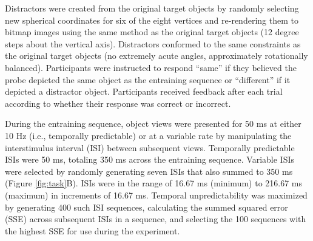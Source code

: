 \documentclass[dwyatte_dissertation.tex]{subfiles}
\begin{document}
Distractors were created from the original target objects by randomly selecting new spherical coordinates for six of the eight vertices and re-rendering them to bitmap images using the same method as the original target objects (12 degree steps about the vertical axis). Distractors conformed to the same constraints as the original target objects (no extremely acute angles, approximately rotationally balanced). Participants were instructed to respond ``same'' if they believed the probe depicted the same object as the entraining sequence or ``different'' if it depicted a distractor object. Participants received feedback after each trial according to whether their response was correct or incorrect. %

During the entraining sequence, object views were presented for 50 ms at either 10 Hz (i.e., temporally predictable) or at a variable rate by manipulating the interstimulus interval (ISI) between subsequent views. Temporally predictable ISIs were 50 ms, totaling 350 ms across the entraining sequence. Variable ISIs were selected by randomly generating seven ISIs that also summed to 350 ms (Figure \ref{fig:task}B). ISIs were in the range of 16.67 ms (minimum) to 216.67 ms (maximum) in increments of 16.67 ms. Temporal unpredictability was maximized by generating 400 such ISI sequences, calculating the summed squared error (SSE) across subsequent ISIs in a sequence, and selecting the 100 sequences with the highest SSE for use during the experiment.
\end{document}
